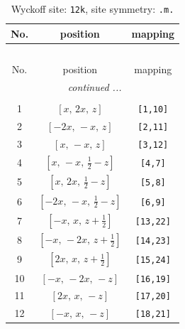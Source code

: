 \documentclass[fleqn,8pt]{jsarticle}
\begin{document}
\begin{longtable}{ccc}
\caption{Wyckoff site: {\tt 12k}, site symmetry: {\tt .m.}}
 \\
 \hline \hline
No. & position & mapping \\ \hline \endfirsthead

\multicolumn{2}{l}{\tablename\ \thetable{}} \\
 \hline \hline
No. & position & mapping \\ \hline \endhead

 \hline \hline
\multicolumn{2}{r}{\footnotesize\it continued ...} \\ \endfoot

 \hline \hline
\multicolumn{2}{r}{} \\ \endlastfoot

1 & $\left[ x,\, 2 x,\, z \right]$ & {\tt [1,10]} \\ \hline
2 & $\left[ - 2 x,\, - x,\, z \right]$ & {\tt [2,11]} \\ \hline
3 & $\left[ x,\, - x,\, z \right]$ & {\tt [3,12]} \\ \hline
4 & $\left[ x,\, - x,\, \frac{1}{2} - z \right]$ & {\tt [4,7]} \\ \hline
5 & $\left[ x,\, 2 x,\, \frac{1}{2} - z \right]$ & {\tt [5,8]} \\ \hline
6 & $\left[ - 2 x,\, - x,\, \frac{1}{2} - z \right]$ & {\tt [6,9]} \\ \hline
7 & $\left[ - x,\, x,\, z + \frac{1}{2} \right]$ & {\tt [13,22]} \\ \hline
8 & $\left[ - x,\, - 2 x,\, z + \frac{1}{2} \right]$ & {\tt [14,23]} \\ \hline
9 & $\left[ 2 x,\, x,\, z + \frac{1}{2} \right]$ & {\tt [15,24]} \\ \hline
10 & $\left[ - x,\, - 2 x,\, - z \right]$ & {\tt [16,19]} \\ \hline
11 & $\left[ 2 x,\, x,\, - z \right]$ & {\tt [17,20]} \\ \hline
12 & $\left[ - x,\, x,\, - z \right]$ & {\tt [18,21]} \\
\end{longtable}
\renewcommand{\arraystretch}{1.2}
\end{document}

